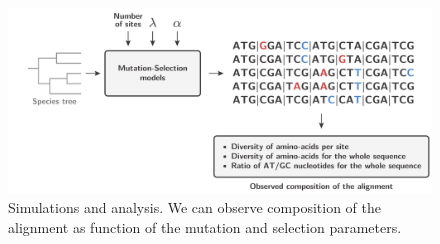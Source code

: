 \begin{figure}[thbp]
	\begin{center}
		\includegraphics[width=\textwidth] {figures/mut-bias-simulations}
	\end{center}
	\caption[Simulations and analysis]{Simulations and analysis. We can observe composition of the alignment as function of the mutation and selection parameters.}
\end{figure}

